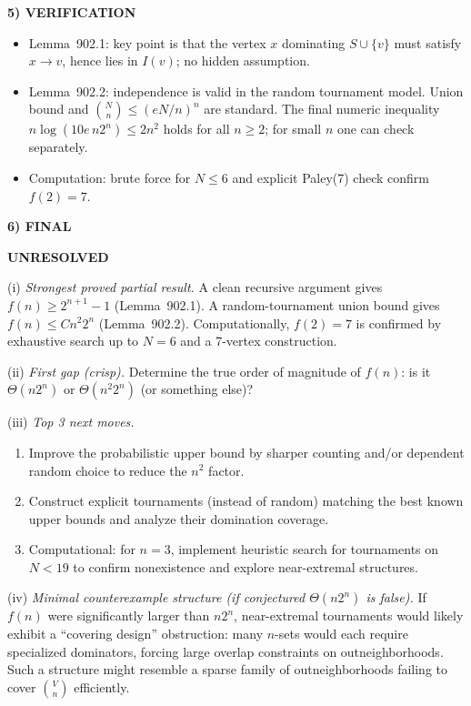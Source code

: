 \medskip
\noindent\textbf{5) VERIFICATION}

\begin{itemize}
\item Lemma~902.1: key point is that the vertex $x$ dominating $S\cup\{v\}$ must
satisfy $x\to v$, hence lies in $I(v)$; no hidden assumption.
\item Lemma~902.2: independence is valid in the random tournament model.
Union bound and $\binom{N}{n}\le (eN/n)^n$ are standard.
The final numeric inequality $n\log(10e\,n2^n)\le 2n^2$ holds for all $n\ge 2$;
for small $n$ one can check separately.
\item Computation: brute force for $N\le 6$ and explicit Paley(7) check confirm
$f(2)=7$.
\end{itemize}

\medskip
\noindent\textbf{6) FINAL}

\textbf{UNRESOLVED}

(i) \emph{Strongest proved partial result.}
A clean recursive argument gives $f(n)\ge 2^{n+1}-1$ (Lemma~902.1).
A random-tournament union bound gives $f(n)\le C n^2 2^n$ (Lemma~902.2).
Computationally, $f(2)=7$ is confirmed by exhaustive search up to $N=6$ and a
7-vertex construction.

(ii) \emph{First gap (crisp).}
Determine the true order of magnitude of $f(n)$: is it $\Theta(n2^n)$ or
$\Theta(n^2 2^n)$ (or something else)?

(iii) \emph{Top 3 next moves.}
\begin{enumerate}
\item Improve the probabilistic upper bound by sharper counting and/or dependent
random choice to reduce the $n^2$ factor.
\item Construct explicit tournaments (instead of random) matching the best known
upper bounds and analyze their domination coverage.
\item Computational: for $n=3$, implement heuristic search for tournaments on
$N<19$ to confirm nonexistence and explore near-extremal structures.
\end{enumerate}

(iv) \emph{Minimal counterexample structure (if conjectured $\Theta(n2^n)$ is false).}
If $f(n)$ were significantly larger than $n2^n$, near-extremal tournaments would
likely exhibit a “covering design” obstruction: many $n$-sets would each require
specialized dominators, forcing large overlap constraints on outneighborhoods.
Such a structure might resemble a sparse family of outneighborhoods failing to
cover $\binom{V}{n}$ efficiently.
